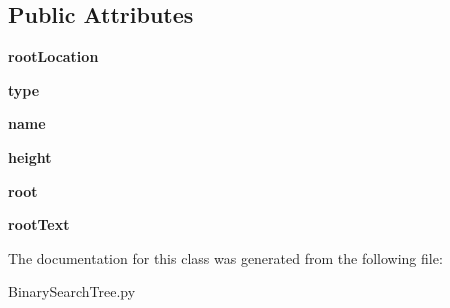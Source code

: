 \subsection*{Public Attributes}
\begin{DoxyCompactItemize}
\item 
{\bfseries root\+Location}\hypertarget{class_binary_search_tree_1_1_binary_search_tree_a399ad4c8ba4b21962841a0895f4933a5}{}\label{class_binary_search_tree_1_1_binary_search_tree_a399ad4c8ba4b21962841a0895f4933a5}

\item 
{\bfseries type}\hypertarget{class_binary_search_tree_1_1_binary_search_tree_a28336f9c105f55dd0242225f94491a08}{}\label{class_binary_search_tree_1_1_binary_search_tree_a28336f9c105f55dd0242225f94491a08}

\item 
{\bfseries name}\hypertarget{class_binary_search_tree_1_1_binary_search_tree_a507e958f649521d8d853007eefe3149b}{}\label{class_binary_search_tree_1_1_binary_search_tree_a507e958f649521d8d853007eefe3149b}

\item 
{\bfseries height}\hypertarget{class_binary_search_tree_1_1_binary_search_tree_a8bb002fc1b00983a2512240378a5ccc2}{}\label{class_binary_search_tree_1_1_binary_search_tree_a8bb002fc1b00983a2512240378a5ccc2}

\item 
{\bfseries root}\hypertarget{class_binary_search_tree_1_1_binary_search_tree_a4aa0ee481a5c399dc220c4c2284c7884}{}\label{class_binary_search_tree_1_1_binary_search_tree_a4aa0ee481a5c399dc220c4c2284c7884}

\item 
{\bfseries root\+Text}\hypertarget{class_binary_search_tree_1_1_binary_search_tree_af6103954606e866294ab429e5b24aa01}{}\label{class_binary_search_tree_1_1_binary_search_tree_af6103954606e866294ab429e5b24aa01}

\end{DoxyCompactItemize}


The documentation for this class was generated from the following file\+:\begin{DoxyCompactItemize}
\item 
Binary\+Search\+Tree.\+py\end{DoxyCompactItemize}
